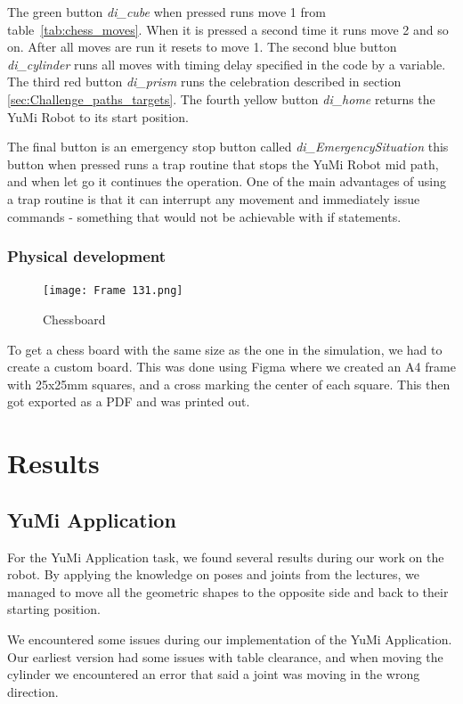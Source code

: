 \documentclass[a4paper,12pt]{article}
\begin{document}
The green button \textit{di\_cube} when pressed runs move 1 from table~\ref{tab:chess_moves}. When it is pressed a second time it runs move 2 and so on. After all moves are run it resets to move 1. The second blue button \textit{di\_cylinder} runs all moves with timing delay specified in the code by a variable. The third red button \textit{di\_prism} runs the celebration described in section \ref{sec:Challenge_paths_targets}. The fourth yellow button \textit{di\_home} returns the YuMi Robot to its start position.

The final button is an emergency stop button called \textit{di\_EmergencySituation} this button when pressed runs a trap routine that stops the YuMi Robot mid path, and when let go it continues the operation. One of the main advantages of using a trap routine is that it can interrupt any movement and immediately issue commands - something that would not be achievable with if statements.

\subsubsection{Physical development}
\begin{figure}[h!]
    \centering
    \texttt{[image: Frame 131.png]}
    \caption{Chessboard }
    \label{fig:enter-label}
\end{figure}
To get a chess board with the same size as the one in the simulation, we had to create a custom board. This was done using Figma where we created an A4 frame with 25x25mm squares, and a cross marking the center of each square. This then got exported as a PDF and was printed out.



\section{Results}
\subsection{YuMi Application}
For the YuMi Application task, we found several results during our work on the robot. By applying the knowledge on poses and joints from the lectures, we managed to move all the geometric shapes to the opposite side and back to their starting position. 

We encountered some issues during our implementation of the YuMi Application. Our earliest version had some issues with table clearance, and when moving the cylinder we encountered an error that said a joint was moving in the wrong direction.
\end{document}
